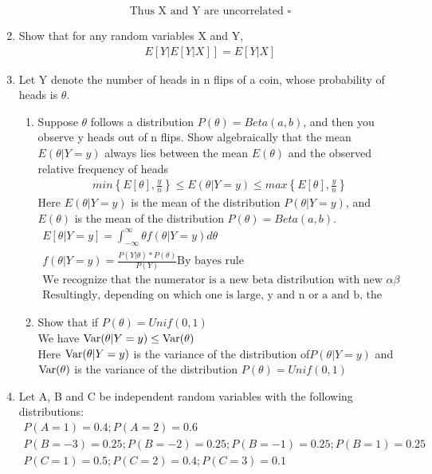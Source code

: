 \documentclass[11pt]{article}
\newcommand{\Var}{\mathop{\rm Var}}
\begin{document}
\begin{enumerate}
\begin{gather}
	\text{Thus X and Y are uncorrelated }\square
\end{gather}
\item Show that for any random variables X and Y,
\begin{gather}
	E[Y|E[Y|X]]=E[Y|X]
\end{gather}
\item Let Y denote the number of heads in n flips of a coin, whose probability of heads is $\theta$.
\begin{enumerate}
	\item Suppose $\theta$ follows a distribution $P(\theta) = Beta(a, b)$, and then you observe y heads out of n flips.
	Show algebraically that the mean $E(\theta | Y = y)$ always lies between the mean $E(\theta)$ and the observed
	relative frequency of heads
	\begin{gather}
		min\left\{E[\theta],\frac{y}{n}\right\}\le E(\theta | Y = y) \le max\left\{E[\theta],\frac{y}{n}\right\}
	\end{gather}
	Here $E(\theta| Y = y)$ is the mean of the distribution $P(\theta | Y = y)$, and $E(\theta)$ is the mean of the distribution
		$P(\theta) = Beta(a, b)$.
	\begin{gather}
		E[\theta|Y=y] = \int_{-\infty}^{\infty} \theta f(\theta|Y=y) d\theta\\
		f(\theta|Y=y)=\frac{P(Y|\theta) * P(\theta)}{P(Y)} \text{By bayes rule}\\
		\text{We recognize that the numerator is a new beta distribution with new } \alpha \beta\\
		\text{Resultingly, depending on which one is large, y and n or a and b, the exepected alue will lie between them?}
	\end{gather}
	\item Show that if $P(\theta) = Unif(0,1)$\\
	We have $\Var(\theta|Y=y)\le \Var(\theta)$\\
	Here $\Var(\theta|Y=y)$ is the variance of the distribution of$ P(\theta |Y=y)$ and $\Var(\theta)$ is the variance of the distribution $P(\theta) = Unif(0,1)$
\end{enumerate}
\item
Let A, B and C be independent random variables with the following distributions:
\begin{gather}
	P(A = 1) = 0.4; P(A = 2) = 0.6\\
	P(B = -3) = 0.25; P(B = -2) = 0.25; P(B = -1) = 0.25; P(B = 1) = 0.25\\
	P(C = 1) = 0.5; P(C = 2) = 0.4; P(C = 3) = 0.1

\end{gather}
\end{enumerate}
\end{document}
